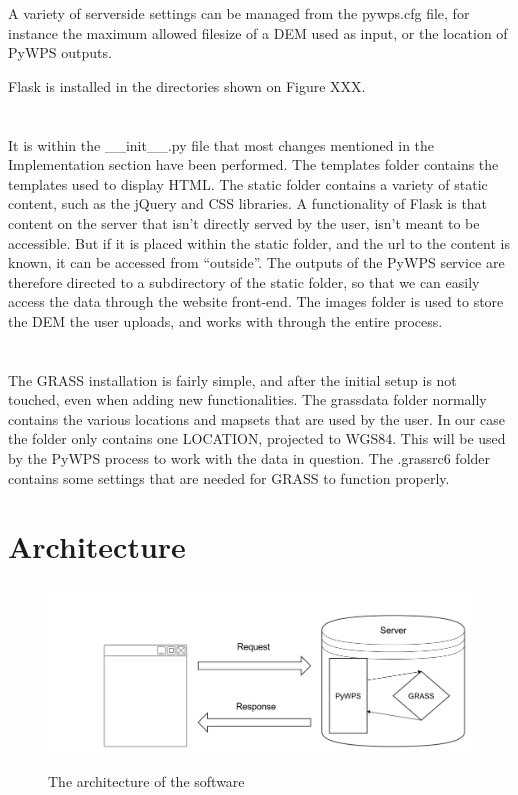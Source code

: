 A variety of serverside settings can be managed from the pywps.cfg file, for instance the maximum allowed filesize of a DEM used as input, or the location of PyWPS outputs.

Flask is installed in the directories shown on Figure XXX.\\



\\
\\


It is within the \_\_init\_\_.py file that most changes mentioned in the Implementation section have been performed. The templates folder contains the templates used to display HTML. The static folder contains a variety of static content, such as the jQuery and CSS libraries. A functionality of Flask is that content on the server that isn't directly served by the user, isn't meant to be accessible. But if it is placed within the static folder, and the url to the content is known, it can be accessed from “outside”. The outputs of the PyWPS service are therefore directed to a subdirectory of the static folder, so that we can easily access the data through the website front-end.
The images folder is used to store the DEM the user uploads, and works with through the entire process.\\

\\
\\

The GRASS installation is fairly simple, and after the initial setup is not touched, even when adding new functionalities. The grassdata folder normally contains the various locations and mapsets that are used by the user. In our case the folder only contains one LOCATION, projected to WGS84. This will be used by the PyWPS process to work with the data in question. 
The .grassrc6 folder contains some settings that are needed for GRASS to function properly.

\section{Architecture}
\begin{figure}[h!]
\centering
	{\includegraphics[width=\linewidth]{gfx/Analysis_Architecture/grass_pywps.png}}
\caption{The architecture of the software}
\label{fig:grass_archi}
\end{figure}


